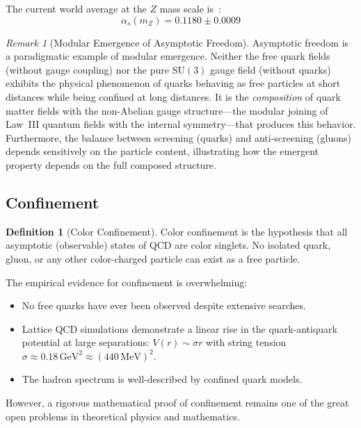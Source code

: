 \documentclass[12pt]{article}
\theoremstyle{definition}
\newtheorem{definition}[theorem]{Definition}
\theoremstyle{remark}
\newtheorem{remark}[theorem]{Remark}
\newcommand{\GeV}{\,\mathrm{GeV}}
\newcommand{\MeV}{\,\mathrm{MeV}}
\begin{document}
The current world average at the $Z$ mass scale is~\cite{PDG2024}:
\begin{equation}
\alpha_s(m_Z) = 0.1180 \pm 0.0009
\end{equation}

\begin{remark}[Modular Emergence of Asymptotic Freedom]
\label{rem:asympfreedom}
Asymptotic freedom is a paradigmatic example of modular emergence. Neither the free quark fields (without gauge coupling) nor the pure $\mathrm{SU}(3)$ gauge field (without quarks) exhibits the physical phenomenon of quarks behaving as free particles at short distances while being confined at long distances. It is the \emph{composition} of quark matter fields with the non-Abelian gauge structure---the modular joining of Law~III quantum fields with the internal symmetry---that produces this behavior. Furthermore, the balance between screening (quarks) and anti-screening (gluons) depends sensitively on the particle content, illustrating how the emergent property depends on the full composed structure.
\end{remark}

\subsection{Confinement}

\begin{definition}[Color Confinement]
\label{def:confinement}
Color confinement is the hypothesis that all asymptotic (observable) states of QCD are color singlets. No isolated quark, gluon, or any other color-charged particle can exist as a free particle.
\end{definition}

The empirical evidence for confinement is overwhelming:
\begin{itemize}
    \item No free quarks have ever been observed despite extensive searches.
    \item Lattice QCD simulations demonstrate a linear rise in the quark-antiquark potential at large separations: $V(r) \sim \sigma r$ with string tension $\sigma \approx 0.18\GeV^2 \approx (440\MeV)^2$.
    \item The hadron spectrum is well-described by confined quark models.
\end{itemize}

However, a rigorous mathematical proof of confinement remains one of the great open problems in theoretical physics and mathematics.
\end{document}
